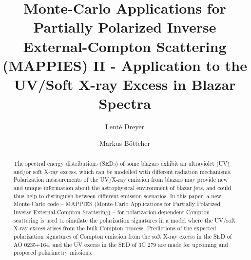 \documentclass[twocolumn, tighten, twocolappendix]{aastex63}
\begin{document}
\title{Monte-Carlo Applications for Partially Polarized Inverse External-Compton Scattering (MAPPIES) II - Application to the UV/Soft X-ray Excess in Blazar Spectra}

\author[0000-0002-4971-3672]{Lent{\'e} Dreyer}
\author[0000-0002-8434-5692]{Markus B{\"o}ttcher}

\begin{abstract}
    The spectral energy distributions (SEDs) of some blazars exhibit an ultraviolet (UV) and/or soft X-ray excess, which can be modelled with different radiation mechanisms. Polarization measurements of the UV/X-ray emission from blazars may provide new and unique information about the astrophysical environment of blazar jets, and could thus help to distinguish between different emission scenarios. In this paper, a new Monte-Carlo code -- MAPPIES (Monte-Carlo Applications for Partially Polarized Inverse External-Compton Scattering) -- for polarization-dependent Compton scattering is used to simulate the polarization signatures in a model where the UV/soft X-ray excess arises from the bulk Compton process. Predictions of the expected polarization signatures of Compton emission from the soft X-ray excess in the SED of AO 0235+164, and the UV excess in the SED of 3C 279 are made for upcoming and proposed polarimetry missions. 
\end{abstract}
\end{document}
